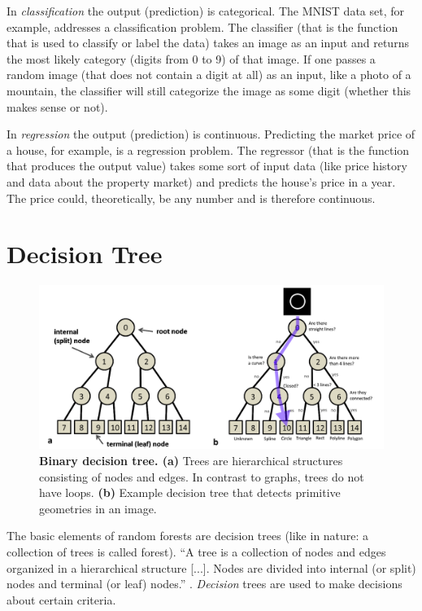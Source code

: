 \documentclass[a4paper]{report}
\begin{document}
    In \textit{classification} the output (prediction) is categorical. The MNIST \cite{mnist} data set, for example, addresses a classification problem. The classifier (that is the function that is used to classify or label the data) takes an image as an input and returns the most likely category (digits from 0 to 9) of that image. If one passes a random image (that does not contain a digit at all) as an input, like a photo of a mountain, the classifier will still categorize the image as some digit (whether this makes sense or not).
    
    In \textit{regression} the output (prediction) is continuous. Predicting the market price of a house, for example, is a regression problem. The regressor (that is the function that produces the output value) takes some sort of input data (like price history and data about the property market) and predicts the house's price in a year. The price could, theoretically, be any number and is therefore continuous.
    
    \chapter{Decision Tree}
    
    \begin{figure}[h]
    \centering
    \includegraphics[width=\textwidth]{decisiontree}
    \caption{\textbf{Binary decision tree. (a)} Trees are hierarchical structures consisting of nodes and edges. In contrast to graphs, trees do not have loops. \textbf{(b)} Example decision tree that detects primitive geometries in an image. }
    \label{fig:dtree}
    \end{figure}
    
    The basic elements of random forests are decision trees (like in nature: a collection of trees is called forest). ``A tree is a collection of nodes and edges organized in a hierarchical structure [...]. Nodes are divided into internal (or split) nodes and terminal (or leaf) nodes.'' \cite[p.6]{ms11}. \textit{Decision} trees are used to make decisions about certain criteria. 
    
\end{document}

